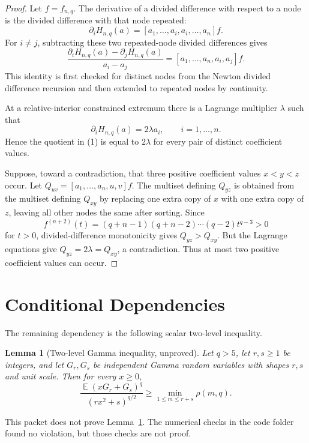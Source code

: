 \documentclass[11pt]{amsart}
\newtheorem{lemma}{Lemma}
\DeclareMathOperator{\E}{\mathbb E}
\begin{document}
\begin{proof}
Let \(f=f_{n,q}\).  The derivative of a divided difference with respect to a
node is the divided difference with that node repeated:
\[
  \partial_i H_{n,q}(a)
  =[a_1,\ldots,a_i,a_i,\ldots,a_n]f .
\]
For \(i\ne j\), subtracting these two repeated-node divided differences gives
\[
  \frac{\partial_i H_{n,q}(a)-\partial_j H_{n,q}(a)}{a_i-a_j}
  =[a_1,\ldots,a_n,a_i,a_j]f . \tag{1}
\]
This identity is first checked for distinct nodes from the Newton divided
difference recursion and then extended to repeated nodes by continuity.

At a relative-interior constrained extremum there is a Lagrange multiplier
\(\lambda\) such that
\[
  \partial_i H_{n,q}(a)=2\lambda a_i,\qquad i=1,\ldots,n.
\]
Hence the quotient in (1) is equal to \(2\lambda\) for every pair of distinct
coefficient values.

Suppose, toward a contradiction, that three positive coefficient values
\(x<y<z\) occur.  Let \(Q_{uv}=[a_1,\ldots,a_n,u,v]f\).  The multiset defining
\(Q_{yz}\) is obtained from the multiset defining \(Q_{xy}\) by replacing one
extra copy of \(x\) with one extra copy of \(z\), leaving all other nodes the
same after sorting.  Since
\[
  f^{(n+2)}(t)
  =(q+n-1)(q+n-2)\cdots(q-2)t^{q-3}>0
\]
for \(t>0\), divided-difference monotonicity gives \(Q_{yz}>Q_{xy}\).
But the Lagrange equations give \(Q_{yz}=2\lambda=Q_{xy}\), a contradiction.
Thus at most two positive coefficient values can occur.
\end{proof}

\section*{Conditional Dependencies}

The remaining dependency is the following scalar two-level inequality.

\begin{lemma}[Two-level Gamma inequality, unproved]\label{lem:two-level}
Let \(q>5\), let \(r,s\ge1\) be integers, and let \(G_r,G_s\) be independent
Gamma random variables with shapes \(r,s\) and unit scale.  Then for every
\(x\ge0\),
\[
  \frac{\E(xG_r+G_s)^q}{(rx^2+s)^{q/2}}
  \ge
  \min_{1\le m\le r+s}\rho(m,q).
\]
\end{lemma}

This packet does not prove Lemma~\ref{lem:two-level}.  The numerical checks in
the code folder found no violation, but those checks are not proof.
\end{document}
